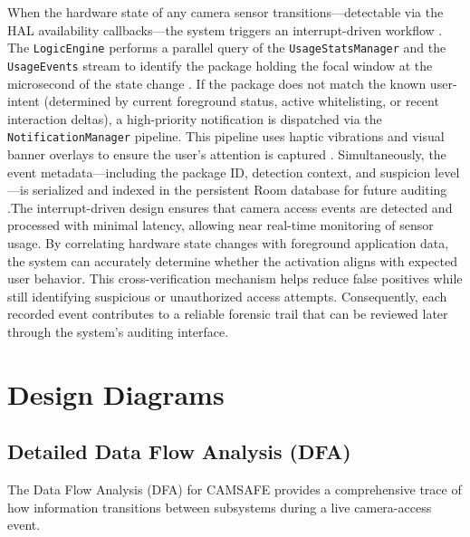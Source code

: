 \documentclass[12pt,a4paper]{report}
\begin{document}
\begin{enumerate}
    When the hardware state of any camera sensor transitions—detectable via the HAL availability callbacks—the system triggers an interrupt-driven workflow \cite{androidhal}. The \texttt{LogicEngine} performs a parallel query of the \texttt{UsageStatsManager} and the \texttt{UsageEvents} stream to identify the package holding the focal window at the microsecond of the state change \cite{contextaware}. If the package does not match the known user-intent (determined by current foreground status, active whitelisting, or recent interaction deltas), a high-priority notification is dispatched via the \texttt{NotificationManager} pipeline. This pipeline uses haptic vibrations and visual banner overlays to ensure the user's attention is captured \cite{privacydot}. Simultaneously, the event metadata—including the package ID, detection context, and suspicion level—is serialized and indexed in the persistent Room database for future auditing \cite{smarthome}.The interrupt-driven design ensures that camera access events are detected and processed with minimal latency, allowing near real-time monitoring of sensor usage. By correlating hardware state changes with foreground application data, the system can accurately determine whether the activation aligns with expected user behavior. This cross-verification mechanism helps reduce false positives while still identifying suspicious or unauthorized access attempts. Consequently, each recorded event contributes to a reliable forensic trail that can be reviewed later through the system’s auditing interface.


    \section{Design Diagrams}
    \subsection{Detailed Data Flow Analysis (DFA)}

    The Data Flow Analysis (DFA) for CAMSAFE provides a comprehensive trace of how information transitions between subsystems during a live camera-access event. 



\end{enumerate}
\end{document}
